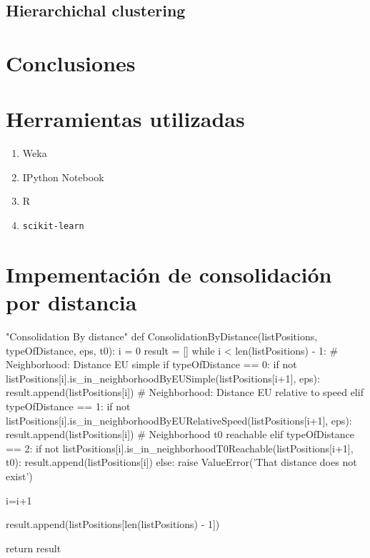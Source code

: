 \documentclass[a4paper, 12pt]{article}
\begin{document}
\pagebreak
\subsection{Hierarchichal clustering}



\pagebreak
\section{Conclusiones}

\pagebreak
\section{Herramientas utilizadas}

\begin{enumerate}
	\item Weka
	\item IPython Notebook
	\item R
	\item \texttt{scikit-learn}


\end{enumerate}

\newpage


\appendix
\section{Impementaci\'on de consolidaci\'on por distancia} \label{App:AppendixA}

\begin{python}
"Consolidation By distance"
def ConsolidationByDistance(listPositions, typeOfDistance, eps, t0):
	i = 0
	result = []
	while i < len(listPositions) - 1:
		# Neighborhood: Distance EU simple
		if typeOfDistance == 0:
			if not listPositions[i].is_in_neighborhoodByEUSimple(listPositions[i+1], eps):
				result.append(listPositions[i])
		# Neighborhood: Distance EU relative to speed
		elif typeOfDistance == 1:
			if not listPositions[i].is_in_neighborhoodByEURelativeSpeed(listPositions[i+1], eps):
				result.append(listPositions[i])
		# Neighborhood t0 reachable
		elif typeOfDistance == 2:
			if not listPositions[i].is_in_neighborhoodT0Reachable(listPositions[i+1], t0):
				result.append(listPositions[i])
		else:
			raise ValueError('That distance does not exist')

		i=i+1

	result.append(listPositions[len(listPositions) - 1])

	return result

\end{python}
\end{document}
